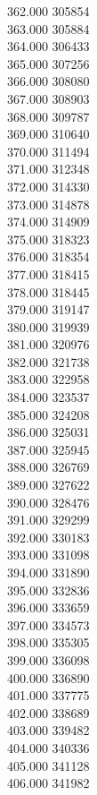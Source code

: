 { 362.000	305854 \\
 363.000	305884 \\
 364.000	306433 \\
 365.000	307256 \\
 366.000	308080 \\
 367.000	308903 \\
 368.000	309787 \\
 369.000	310640 \\
 370.000	311494 \\
 371.000	312348 \\
 372.000	314330 \\
 373.000	314878 \\
 374.000	314909 \\
 375.000	318323 \\
 376.000	318354 \\
 377.000	318415 \\
 378.000	318445 \\
 379.000	319147 \\
 380.000	319939 \\
 381.000	320976 \\
 382.000	321738 \\
 383.000	322958 \\
 384.000	323537 \\
 385.000	324208 \\
 386.000	325031 \\
 387.000	325945 \\
 388.000	326769 \\
 389.000	327622 \\
 390.000	328476 \\
 391.000	329299 \\
 392.000	330183 \\
 393.000	331098 \\
 394.000	331890 \\
 395.000	332836 \\
 396.000	333659 \\
 397.000	334573 \\
 398.000	335305 \\
 399.000	336098 \\
 400.000	336890 \\
 401.000	337775 \\
 402.000	338689 \\
 403.000	339482 \\
 404.000	340336 \\
 405.000	341128 \\
 406.000	341982 \\
}
